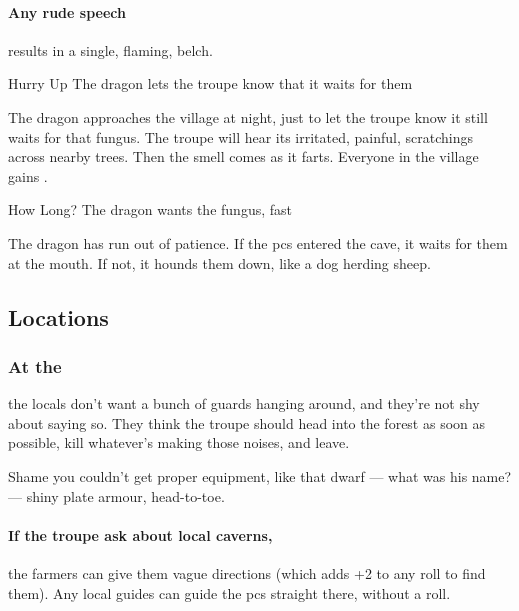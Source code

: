 \documentclass[10pt,twoside]{book}
\begin{document}
\paragraph{Any rude speech}
results in a single, flaming, belch.


\vspace{-2em}
{Hurry Up}%
{The dragon lets the troupe know that it waits for them}%

The dragon approaches the \gls{village} at night, just to let the troupe know it still waits for that fungus.
The troupe will hear its irritated, painful, scratchings across nearby trees.
Then the smell comes as it farts.
Everyone in the \gls{village} gains .

{How Long?}%
{The dragon wants the fungus, fast}%

The dragon has run out of patience.
If the \glspl{pc} entered the cave, it waits for them at the mouth.
If not, it hounds them down, like a dog herding sheep.

\subsection{Locations}

\subsubsection{At the }\label{wyrmBailey}
the locals don't want a bunch of \glspl{guard} hanging around, and they're not shy about saying so.
They think the troupe should head into the forest as soon as possible, kill whatever's making those noises, and leave.

\begin{speechtext}
  Shame you couldn't get proper equipment, like that dwarf --- what was his name? --- shiny plate armour, head-to-toe.
\end{speechtext}

\paragraph{If the troupe ask about local caverns,}
the farmers can give them vague directions (which adds +2 to any roll to find them).
Any local guides can guide the \glspl{pc} straight there, without a roll.
\end{document}
